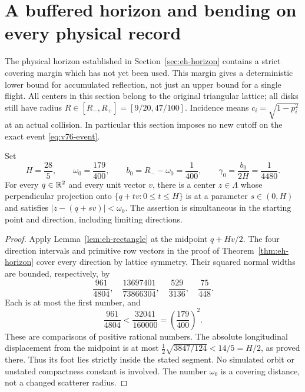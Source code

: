 \section{A buffered horizon and bending on every physical record}
\label{sec:cb-bending}
The physical horizon established in Section~\ref{sec:eh-horizon}
contains a strict covering margin which has not yet been used.  This
margin gives a deterministic lower bound for accumulated reflection,
not just an upper bound for a single flight.  All centers in this
section belong to the original triangular lattice; all disks still
have radius $R\in[R_-,R_+]=[9/20,47/100]$.  Incidence means
$c_i=\sqrt{1-p_i^2}$ at an actual collision.  In particular this
section imposes no new cutoff on the exact event
\eqref{eq:v76-event}.

\begin{lemma}
\label{lem:cb-buffer}
Set
\begin{equation}\label{eq:cb-constants}
 H=\frac{28}{5},\qquad \omega_0=\frac{179}{400},\qquad
 b_0=R_--\omega_0=\frac1{400},\qquad
 \gamma_0=\frac{b_0}{2H}=\frac1{4480}.
\end{equation}
For every $q\in\mathbb R^2$ and every unit vector $v$, there is a center
$z\in\Lambda$ whose perpendicular projection onto
$\{q+tv:0\leq t\leq H\}$ is at a parameter $s\in(0,H)$ and
satisfies $|z-(q+sv)|<\omega_0$.  The assertion is simultaneous
in the starting point and direction, including limiting directions.
\end{lemma}
\begin{proof}
Apply Lemma~\ref{lem:eh-rectangle} at the midpoint $q+Hv/2$.
The four direction intervals and primitive row vectors in the proof
of Theorem~\ref{thm:eh-horizon} cover every direction by lattice
symmetry.  Their squared normal widths are bounded, respectively, by
\[
 \frac{961}{4804},\quad\frac{13697401}{73866304},\quad
 \frac{529}{3136},\quad\frac{75}{448}.
\]
Each is at most the first number, and
\[
 \frac{961}{4804}<\frac{32041}{160000}
                  =\left(\frac{179}{400}\right)^2.
\]
These are comparisons of positive rational numbers.  The absolute
longitudinal displacement from the midpoint is at most
$\tfrac12\sqrt{3847/124}<14/5=H/2$, as proved there.  Thus its foot
lies strictly inside the stated segment.  No simulated orbit or
unstated compactness constant is involved.  The number $\omega_0$
is a covering distance, not a changed scatterer radius.
\end{proof}

